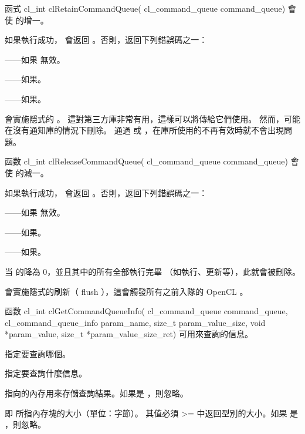 函式
\startclc
cl_int clRetainCommandQueue(
		cl_command_queue command_queue)
\stopclc
會使  的增一。

如果執行成功， 會返回 。否則，返回下列錯誤碼之一：
\startigBase
\item {}——如果  無效。
\item {}——如果\scdevfailres。
\item {}——如果\schostfailres。
\stopigBase

 會實施隱式的 。
這對第三方庫非常有用，這樣可以將傳給它們使用。
然而，可能在沒有通知庫的情況下刪除。
通過  或  ，在庫所使用的不再有效時就不會出現問題。

函数
\startclc
cl_int clReleaseCommandQueue(
		cl_command_queue command_queue)
\stopclc
會使  的減一。

如果執行成功， 會返回 。否則，返回下列錯誤碼之一：
\startigBase
\item {}——如果  無效。
\item {}——如果\scdevfailres。
\item {}——如果\schostfailres。
\stopigBase

当  的降為 0，並且其中的所有全部執行完畢
（如執行、更新等），此就會被刪除。

會實施隱式的刷新（ flush ），這會觸發所有之前入隊的 OpenCL 。

函数
\startclc
cl_int clGetCommandQueueInfo(
		cl_command_queue command_queue,
		cl_command_queue_info param_name,
		size_t param_value_size,
		void *param_value,
		size_t *param_value_size_ret)
\stopclc
可用來查詢的信息。

 指定要查詢哪個。

 指定要查詢什麼信息。

 指向的內存用來存儲查詢結果。如果是 ，則忽略。

 即  所指內存塊的大小（單位：字節）。
其值必須 >= 中返回型別的大小。如果  是 ，則忽略。

